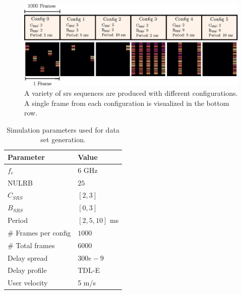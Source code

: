 \begin{figure}
    \centering
    \includegraphics{chapters/part_uplink/figures/data_channel_estimation.eps}
    \caption{A variety of \gls{srs} sequences are produced with different configurations. A single frame from each configuration is visualized in the bottom row. }
    \label{fig:data_channel_estimation}
\end{figure}



\begin{table}[]
\centering
\begin{tabular}{l|l}
\toprule
\textbf{Parameter}                 & \textbf{Value} \\ \midrule
$f_c$ & $6$ GHz \\
NULRB         & $25$             \\
$C_{SRS}$   &  $[2,3]$               \\
$B_{SRS}$ & $[0,3]$ \\
Period & $[2, 5, 10]$ ms \\
\# Frames per config & $1000$ \\
\# Total frames & $6000$ \\
Delay spread  & $300e-9$         \\
Delay profile & TDL-E          \\
User velocity & 5 m/s         
\end{tabular}
\vspace{1em}
\caption{Simulation parameters used for data set generation.}
\label{tab:sim_param_channel_est}
\end{table}

